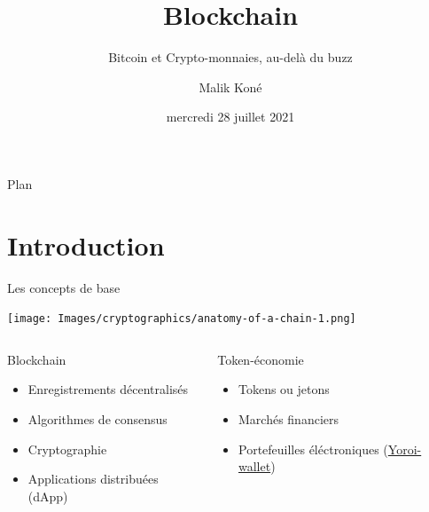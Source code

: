\documentclass{beamer}
\author{Malik Koné}
\date[]{mercredi 28 juillet 2021}
\title{Blockchain}
\subtitle{Bitcoin et Crypto-monnaies, au-delà du buzz}
\begin{document}
{
  \frame[plain]{
  }
}

\begin{frame}{Plan}
  \tableofcontents
\end{frame}


\section{Introduction}
\label{sec:org32a77db}
\begin{frame}[label={sec:org49a1e98}]{Les concepts de base}
  \begin{center}
    \texttt{[image: Images/cryptographics/anatomy-of-a-chain-1.png]}
  \end{center}

  \begin{columns}
    \begin{column}{0.48\columnwidth}
      \begin{block}{Blockchain}
        \begin{itemize}
        \item <1>Enregistrements décentralisés
        \item <1>Algorithmes de consensus
        \item <1>Cryptographie
        \item <1>Applications distribuées (dApp)
        \end{itemize}
      \end{block}
    \end{column}
    \begin{column}{0.48\columnwidth}
      \begin{block}{Token-économie}
        \begin{itemize}
        \item <2> Tokens ou jetons
        \item <2> Marchés financiers
        \item <2-> Portefeuilles éléctroniques (\href{https://yoroi-wallet.com}{Yoroi-wallet})
        \end{itemize}
      \end{block}
    \end{column}
  \end{columns}
\end{frame}
\end{document}
